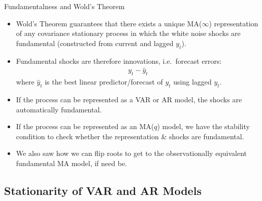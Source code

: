 \documentclass[aspectratio=169, handout]{beamer}
\begin{document}
{\footnotesize
\begin{frame}{Fundamentalness and Wold's Theorem}
\begin{itemize}
  \item Wold's Theorem guarantees that there exists a unique
    MA($\infty$) representation of any covariance stationary process in
    which the white noise shocks are \alert{fundamental} (constructed
    from current and lagged $y_t$).

  \pause
  \item
    Fundamental shocks are therefore \alert{innovations}, i.e.\ forecast
    errors:
    \begin{align*}
      y_t - \hat{y}_t
    \end{align*}
    where $\hat{y}_t$ is the best linear predictor/forecast of $y_t$
    using lagged $y_t$.


  \pause
  \item If the process can be represented as a VAR or AR model, the
    shocks are automatically fundamental.

  \pause
  \item If the process can be represented as an MA($q$) model, we have
    the stability condition to check whether the representation \&
    shocks are fundamental.

  \pause
  \item We also saw how we can flip roots to get to the observationally
    equivalent fundamental MA model, if need be.
\end{itemize}
\end{frame}
}



\subsection{Stationarity of VAR and AR Models}



\end{document}
